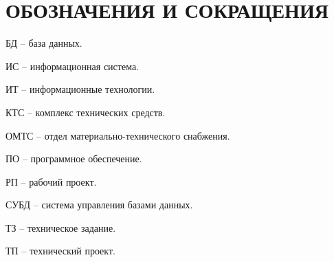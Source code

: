 \section*{ОБОЗНАЧЕНИЯ И СОКРАЩЕНИЯ}

БД -- база данных.

ИС -- информационная система.

ИТ -- информационные технологии. 

КТС -- комплекс технических средств.

ОМТС -- отдел материально-технического снабжения. 

ПО -- программное обеспечение.

РП -- рабочий проект.

СУБД -- система управления базами данных.

ТЗ -- техническое задание.

ТП -- технический проект.

